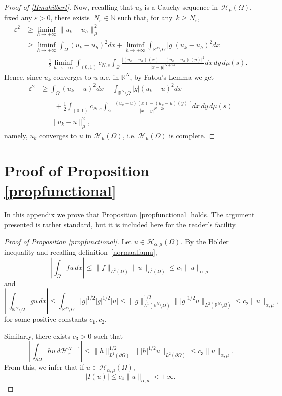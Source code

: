 \documentclass[12pt,a4paper,intlimits,sumlimits]{amsart}
\def \N {\mathbb{N}}
\def \R {\mathbb{R}}
\def \Q {\mathcal Q}
\theoremstyle{definition}
\theoremstyle{plain}
\numberwithin{equation}{section}
\renewcommand{\le}{\leqslant}
\renewcommand{\ge}{\geqslant}
\begin{document}
\begin{appendix}
\begin{proof}[Proof of \eqref{Hmuhilbert}]
Now, recalling that $u_k$ is a Cauchy sequence in~$\mathcal{H}_\mu (\Omega)$,  fixed any $\varepsilon >0$, there exists~$N_\varepsilon\in\N$ such that, for any~$k\ge N_\varepsilon$, 
\begin{align*}
\varepsilon^2 &\ge \liminf_{h\to +\infty} \|u_k -u_h\|^2_{\mu}\\
&\ge \liminf_{h\to +\infty} \int_\Omega (u_k -u_h)^2 dx + \liminf_{h\to +\infty}\int_{\R^N\setminus\Omega} |g|(u_k -u_h)^2 dx\\
&\qquad +\frac12\liminf_{h\to +\infty} \int_{(0, 1)} c_{N, s} \int_{\Q}\frac{|(u_k -u_h)(x) - (u_k -u_h)(y)|^2}{|x-y|^{N+2s}} dx\,dy\, d\mu(s).
\end{align*}
Hence,  since $u_k$ converges to $u$ a.e. in $\R^N$,  by Fatou's Lemma we get
\begin{align*}
\varepsilon^2&\ge \int_\Omega (u_k -u)^2 dx + \int_{\R^N\setminus\Omega} |g|(u_k -u)^2 dx\\
&\qquad +\frac12 \int_{(0, 1)} c_{N, s} \int_{\Q}\frac{|(u_k -u)(x) - (u_k -u)(y)|^2}{|x-y|^{N+2s}} dx\,dy\, d\mu(s)\\
&= \|u_k -u\|^2_\mu,
\end{align*}
namely,  $u_k$ converges to $u$ in $\mathcal{H}_\mu (\Omega)$, i.e. $\mathcal{H}_\mu (\Omega)$ is complete.
\end{proof}


\section{Proof of Proposition \ref{propfunctional}}\label{appendixfunctional}
In this appendix we prove that Proposition \ref{propfunctional} holds. The argument presented is rather standard, but it is included here for the reader's facility.

\begin{proof}[Proof of Proposition \ref{propfunctional}]
Let $u\in \mathcal{H}_{\alpha, \mu}(\Omega)$. By the H\"older inequality and recalling definition~\eqref{normaalfamu},
\[
\left| \int_\Omega fu \, dx \right|\le \|f\|_{L^2(\Omega)}\|u\|_{L^2(\Omega)}\le c_1 \|u\|_{\alpha, \mu}
\]
and
\[
\left|\; \int_{\R^N\setminus \Omega} gu \, dx \right|\le \int_{\R^N\setminus\Omega} |g|^{1/2} |g|^{1/2} |u|\le \|g\|^{1/2}_{L^1(\R^N\setminus\Omega)} \| |g|^{1/2} u\|_{L^2(\R^N\setminus\Omega)}\le c_2 \|u\|_{\alpha, \mu},
\]
for some positive constants $c_1, c_2$. 

Similarly, there exists $c_3>0$ such that
\[
\left| \,\int_{\partial\Omega} hu \, d\mathscr{H}_x^{N-1} \right|\le \|h\|^{1/2}_{L^1(\partial\Omega)} \, \| |h|^{1/2} u\|_{L^2(\partial\Omega)} \le c_3 \|u\|_{\alpha, \mu}.
\]
{F}rom this, we infer that if $u\in \mathcal{H}_{\alpha, \mu}(\Omega)$,
\[
| I(u)|\le c_4\|u\|_{\alpha, \mu} <+\infty.
\]


\end{proof}
\end{appendix}
\end{document}
